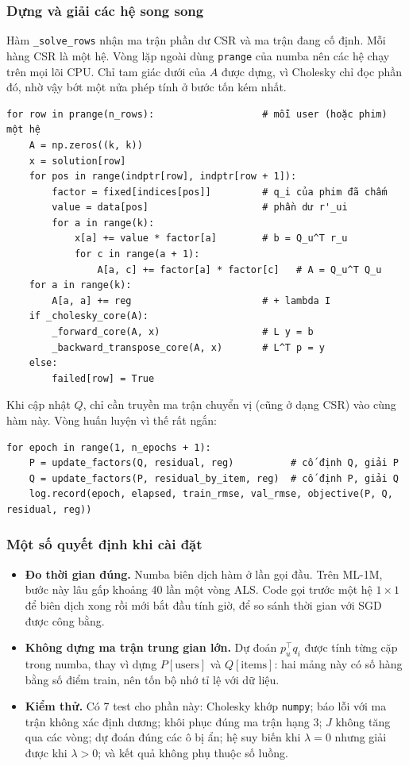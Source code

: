 \subsubsection{Dựng và giải các hệ song song}

Hàm \texttt{\_solve\_rows} nhận ma trận phần dư CSR và ma trận đang cố định. Mỗi hàng CSR là một hệ.
Vòng lặp ngoài dùng \texttt{prange} của numba nên các hệ chạy trên mọi lõi CPU. Chỉ tam giác dưới của
$A$ được dựng, vì Cholesky chỉ đọc phần đó, nhờ vậy bớt một nửa phép tính ở bước tốn kém nhất.
\begin{verbatim}
for row in prange(n_rows):                   # mỗi user (hoặc phim) một hệ
    A = np.zeros((k, k))
    x = solution[row]
    for pos in range(indptr[row], indptr[row + 1]):
        factor = fixed[indices[pos]]         # q_i của phim đã chấm
        value = data[pos]                    # phần dư r'_ui
        for a in range(k):
            x[a] += value * factor[a]        # b = Q_u^T r_u
            for c in range(a + 1):
                A[a, c] += factor[a] * factor[c]   # A = Q_u^T Q_u
    for a in range(k):
        A[a, a] += reg                       # + lambda I
    if _cholesky_core(A):
        _forward_core(A, x)                  # L y = b
        _backward_transpose_core(A, x)       # L^T p = y
    else:
        failed[row] = True
\end{verbatim}
Khi cập nhật $Q$, chỉ cần truyền ma trận chuyển vị (cũng ở dạng CSR) vào cùng hàm này. Vòng huấn
luyện vì thế rất ngắn:
\begin{verbatim}
for epoch in range(1, n_epochs + 1):
    P = update_factors(Q, residual, reg)          # cố định Q, giải P
    Q = update_factors(P, residual_by_item, reg)  # cố định P, giải Q
    log.record(epoch, elapsed, train_rmse, val_rmse, objective(P, Q, residual, reg))
\end{verbatim}

\subsubsection{Một số quyết định khi cài đặt}

\begin{itemize}
  \item \textbf{Đo thời gian đúng.} Numba biên dịch hàm ở lần gọi đầu. Trên ML-1M, bước này lâu gấp
        khoảng 40 lần một vòng ALS. Code gọi trước một hệ $1 \times 1$ để biên dịch xong rồi mới bắt đầu
        tính giờ, để so sánh thời gian với SGD được công bằng.
  \item \textbf{Không dựng ma trận trung gian lớn.} Dự đoán $p_u^\top q_i$ được tính từng cặp trong
        numba, thay vì dựng $P[\text{users}]$ và $Q[\text{items}]$: hai mảng này có số hàng bằng số điểm
        train, nên tốn bộ nhớ tỉ lệ với dữ liệu.
  \item \textbf{Kiểm thử.} Có 7 test cho phần này: Cholesky khớp \texttt{numpy}; báo lỗi với ma trận
        không xác định dương; khôi phục đúng ma trận hạng 3; $J$ không tăng qua các vòng; dự đoán đúng
        các ô bị ẩn; hệ suy biến khi $\lambda = 0$ nhưng giải được khi $\lambda > 0$; và kết quả không
        phụ thuộc số luồng.
\end{itemize}

